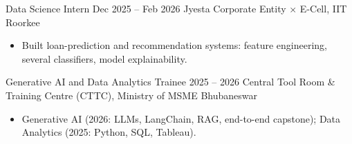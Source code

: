 
\resumeentry
{Data Science Intern}
{Dec 2025 -- Feb 2026}
{Jyesta Corporate Entity $\times$ E-Cell, IIT Roorkee}
{}
\begin{itemize}
\item Built loan-prediction and recommendation systems: feature engineering, several classifiers, model explainability.
\end{itemize}

\entrygap

\resumeentry
{Generative AI and Data Analytics Trainee}
{2025 -- 2026}
{Central Tool Room \& Training Centre (CTTC), Ministry of MSME}
{Bhubaneswar}
\begin{itemize}
\item Generative AI (2026: LLMs, LangChain, RAG, end-to-end capstone); Data Analytics (2025: Python, SQL, Tableau).
\end{itemize}
